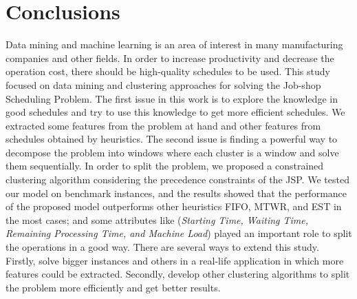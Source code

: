 \documentclass[runningheads]{llncs}
\begin{document}
\section{Conclusions}
\label{sec:conclusions}
Data mining and machine learning is an area of interest in many manufacturing companies and other fields. In order to increase productivity and decrease the operation cost, there should be high-quality schedules to be used. This study focused on data mining and clustering approaches for solving the Job-shop Scheduling Problem. The first issue in this work is to explore the knowledge in good schedules and try to use this knowledge to get more efficient schedules. We extracted some features from the problem at hand and other features from schedules obtained by heuristics. The second issue is finding a powerful way to decompose the problem into windows where each cluster is a window and solve them sequentially. In order to split the problem, we proposed a constrained clustering algorithm considering the precedence constraints of the JSP. We tested our model on benchmark instances, and the results showed that the performance of the proposed model outperforms other heuristics FIFO, MTWR, and EST in the most cases; and some attributes like (\textit{Starting Time, Waiting Time, Remaining Processing Time, and Machine Load}) played an important role to split the operations in a good way. There are several ways to extend this study. Firstly, solve bigger instances and others in a real-life application in which more features could be extracted. Secondly, develop other clustering algorithms to split the problem more efficiently and get better results.



\end{document}
